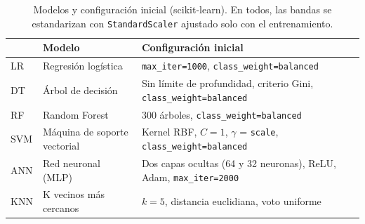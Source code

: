 \begin{table}[htbp]
 \centering
 \small
 \caption{Modelos y configuración inicial (scikit-learn). En todos, las bandas se estandarizan con \texttt{StandardScaler} ajustado solo con el entrenamiento.}
 \label{tab:modelos}
 \begin{tabularx}{\textwidth}{llX}
  \toprule
   & Modelo & Configuración inicial \\
  \midrule
  LR & Regresión logística & \texttt{max\_iter=1000}, \texttt{class\_weight=balanced} \\
  DT & Árbol de decisión & Sin límite de profundidad, criterio Gini, \texttt{class\_weight=balanced} \\
  RF & Random Forest & 300 árboles, \texttt{class\_weight=balanced} \\
  SVM & Máquina de soporte vectorial & Kernel RBF, $C=1$, $\gamma$ = \texttt{scale}, \texttt{class\_weight=balanced} \\
  ANN & Red neuronal (MLP) & Dos capas ocultas (64 y 32 neuronas), ReLU, Adam, \texttt{max\_iter=2000} \\
  KNN & K vecinos más cercanos & $k=5$, distancia euclidiana, voto uniforme \\
  \bottomrule
 \end{tabularx}
\end{table}
